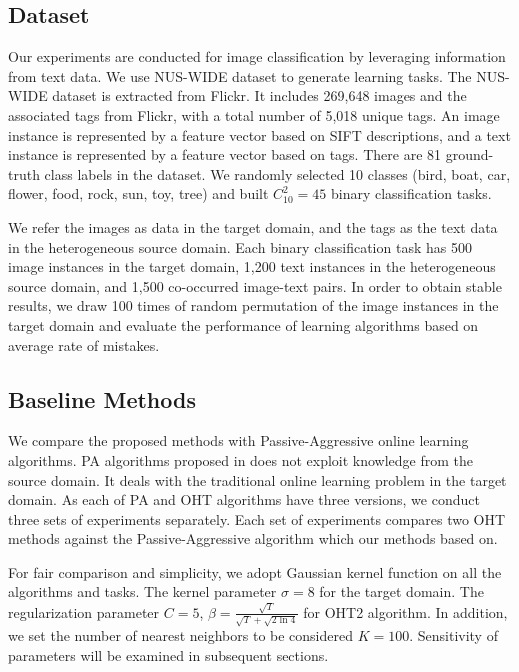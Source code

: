 \documentclass{article} %
\theoremstyle{remark}
\theoremstyle{definition}
\begin{document}
\subsection{Dataset}
Our experiments are conducted for image classification by leveraging information from text data.
We use NUS-WIDE dataset to generate learning tasks.
The NUS-WIDE dataset is extracted from Flickr.
It includes 269,648 images and the associated tags from Flickr, with a total number of 5,018 unique tags.
An image instance is represented by a feature vector based on SIFT descriptions, and a text instance is represented by a feature vector based on tags.
There are 81 ground-truth class labels in the dataset.
We randomly selected 10 classes (bird, boat, car, flower, food, rock, sun, toy, tree) and built $C_{10}^{2} = 45$ binary classification tasks.

We refer the images as data in the target domain, and the tags as the text data in the heterogeneous source domain.
Each binary classification task has 500 image instances in the target domain, 1,200 text instances in the heterogeneous source domain, and 1,500 co-occurred image-text pairs.
In order to obtain stable results, we draw 100 times of random permutation of the image instances in the target domain and evaluate the performance of learning algorithms based on average rate of mistakes.

\subsection{Baseline Methods}
We compare the proposed methods with Passive-Aggressive online learning algorithms.
PA algorithms proposed in \cite{crammer2006online} does not exploit knowledge from the source domain.
It deals with the traditional online learning problem in the target domain.
As each of PA and OHT algorithms have three versions, we conduct three sets of experiments separately.
Each set of experiments compares two OHT methods against the Passive-Aggressive algorithm which our methods based on.

For fair comparison and simplicity, we adopt Gaussian kernel function on all the algorithms and tasks.
The kernel parameter $\sigma = 8$ for the target domain.
The regularization parameter $C = 5$, $ \beta = \frac{\sqrt{T}}{\sqrt{T}+\sqrt{2\ln{4}}} $ for OHT2 algorithm.
In addition, we set the number of nearest neighbors to be considered $K = 100$.
Sensitivity of parameters will be examined in subsequent sections.
\end{document}
